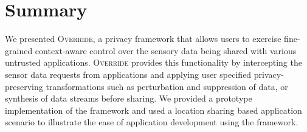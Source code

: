\documentclass[10pt]{sensys-proc}
\begin{document}
\section{Summary}
\label{Sec:conclusion}
We presented \textsc{Override}, a privacy framework that allows users to exercise fine-grained context-aware control over the sensory data being shared with various untrusted applications. \textsc{Override} provides this functionality by intercepting the sensor data requests from applications and applying user specified privacy-preserving transformations such as perturbation and suppression of data, or synthesis of data streams before sharing. We provided a prototype implementation of the framework and used a location sharing based application scenario to illustrate the ease of application development using the framework.

\balance


\end{document}
